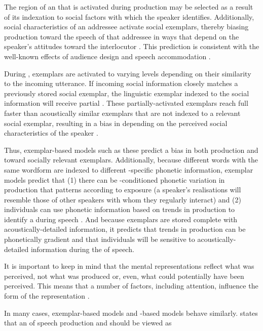 The region of an  that is activated during production may be selected as a result of its indexation to social factors with which the speaker identifies.  Additionally, social characteristics of an addressee activate social exemplars, thereby biasing production toward the speech of that addressee in ways that depend on the speaker's attitudes toward the interlocutor \citep{drageretal2010,babel2012}.  This prediction is consistent with the well-known effects of audience design and speech accommodation \citep{bell1984,gilesetal1991,oprah1999}.

During , exemplars are activated to varying levels depending on their similarity to the incoming utterance.  If incoming social information closely matches a previously stored social exemplar, the linguistic exemplar indexed to the social information will receive partial .  These partially-activated exemplars reach full  faster than acoustically similar exemplars that are not indexed to a relevant social exemplar, resulting in a bias in  depending on the perceived social characteristics of the speaker \citep{strandjohnson1996,niedzielski1999,haywarrendrager2006}.   
 
Thus, exemplar-based models such as these predict a bias in both production and  toward socially relevant exemplars. Additionally, because diffe\-rent words with the same wordform are indexed to different -specific phonetic information, exemplar models predict that (1) there can be -conditioned phonetic variation in production that patterns according to exposure (a speaker's realisations will resemble those of other speakers with whom they regularly interact) and (2) individuals can use phonetic information based on trends in production to identify a  during speech .  And because exemplars are stored complete with acoustically-detailed information, it predicts that trends in production can be phonetically gradient and that individuals will be sensitive to acoustically-detailed information during the  of speech.

It is important to keep in mind that the mental representations reflect what was perceived, not what was produced or, even, what could potentially have been perceived.  This means that a number of factors, including attention, influence the form of the representation \citep{foulkeshay2015}.  

In many cases, exemplar-based models and -based models behave si\-milarly.	 \citet{pierrehumbert2002} states that an  of speech production and  should be viewed as

